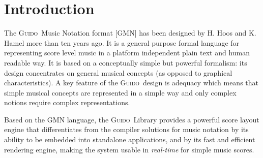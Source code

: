 \documentclass[twoside,10pt,a4paper]{article}
\affiliation{}{}
\title{\papertitle}
\newcommand{\Guido}		{\textsc{Guido}}
\begin{document}
    
\maketitle

\begin{abstract}
Based on the Guido Music Notation format, we have developed tools for music score composition, i.e. operators taking scores both as target and arguments of high level transformations, applicable for example to the time domain (e.g. cutting the head or the tail of a score) or to the structural domains (e.g. putting scores in sequence or in parallel). 
Providing these operations at score level is particularly convenient to express music ideas and to compose these ideas in an homogeneous representation space. However, scores composition gives raise to a set of issues related to the music notation consistency. This paper introduces the \Guido\ Music Notation format, presents the score composition operations, the notation issues and a proposal to solve them.
\end{abstract}


\section{Introduction}\label{sec:intro}
The \Guido\ Music Notation format [GMN] \cite{hoos98} has been designed by H. Hoos and K. Hamel more than ten years ago. It is a general purpose formal language for representing score level music in a platform independent plain text and human readable way. It is based on a conceptually simple but powerful formalism: its design concentrates on general musical concepts (as opposed to graphical characteristics). A key feature of the \Guido\ design is adequacy which means that simple musical concepts are represented in a simple way and only complex notions require complex representations.

Based on the GMN language, the \Guido\ Library \cite{daudin09a,Fober:04b} provides a powerful score layout engine that differentiates from the compiler solutions for music notation \cite{lilypond03,musixtex} by its ability to be embedded into standalone applications, and by its fast and efficient rendering engine, making the system usable in \emph{real-time} for simple music scores.
\end{document}
